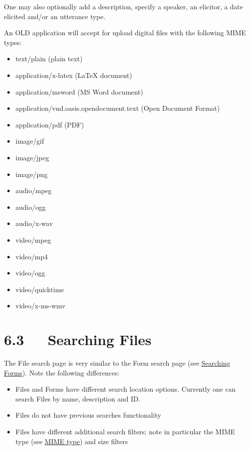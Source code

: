 \documentclass[letterpaper,10pt,english]{sphinxmanual}
\begin{document}
One may also optionally add a description, specify a speaker, an elicitor, a
date elicited and/or an utterance type.

An OLD application will accept for upload digital files with the following MIME
types:
\begin{itemize}
\item {} 
text/plain (plain text)

\item {} 
application/x-latex (LaTeX document)

\item {} 
application/msword (MS Word document)

\item {} 
application/vnd.oasis.opendocument.text (Open Document Format)

\item {} 
application/pdf (PDF)

\item {} 
image/gif

\item {} 
image/jpeg

\item {} 
image/png

\item {} 
audio/mpeg

\item {} 
audio/ogg

\item {} 
audio/x-wav

\item {} 
video/mpeg

\item {} 
video/mp4

\item {} 
video/ogg

\item {} 
video/quicktime

\item {} 
video/x-ms-wmv

\end{itemize}


\section{6.3   Searching Files}
\label{documentation:searching-files}
The File search page is very similar to the Form search page (see
{\hyperref[documentation:searching-forms]{Searching Forms}}).  Note the following differences:
\begin{itemize}
\item {} 
Files and Forms have different search location options.  Currently one can
search Files by name, description and ID.

\item {} 
Files do not have previous searches functionality

\item {} 
Files have different additional search filters; note in particular the
MIME type (see {\hyperref[documentation:mime-type]{MIME type}}) and size filters

\end{itemize}
\end{document}
